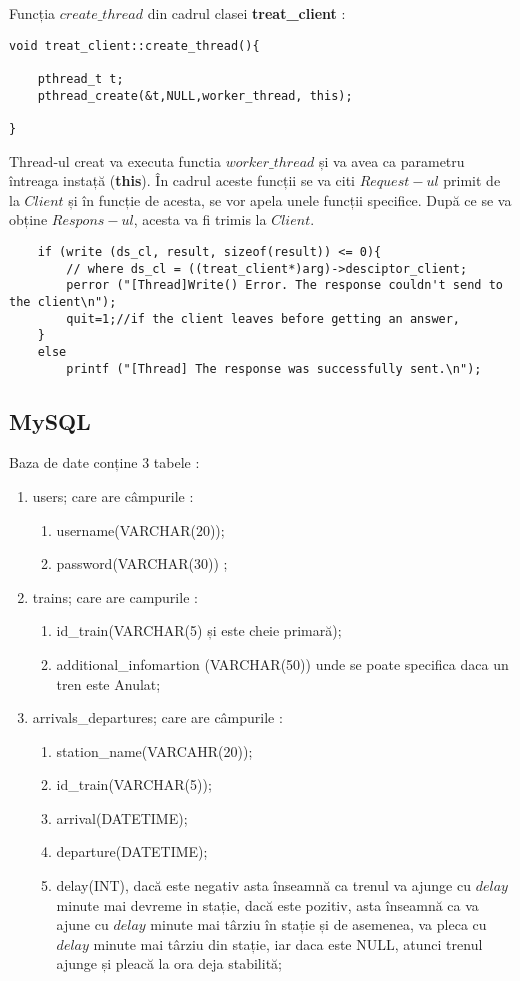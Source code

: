 \documentclass{article}
\begin{document}
Funcția $create\_thread$ din cadrul clasei \textbf{treat\_client} : 
\begin{verbatim}
void treat_client::create_thread(){
    
    pthread_t t;
    pthread_create(&t,NULL,worker_thread, this);

}
\end{verbatim}
Thread-ul creat va executa functia $worker\_thread$ și va avea ca parametru 
întreaga instață (\textbf{this}). În cadrul aceste funcții se va citi $Request-ul$ primit de la $Client$ și în funcție de acesta, se vor apela unele funcții specifice. După ce se va obține $Respons-ul$, acesta va fi trimis la $Client$.
\begin{verbatim}
    if (write (ds_cl, result, sizeof(result)) <= 0){
        // where ds_cl = ((treat_client*)arg)->desciptor_client;
        perror ("[Thread]Write() Error. The response couldn't send to the client\n");
        quit=1;//if the client leaves before getting an answer,
    }
    else
        printf ("[Thread] The response was successfully sent.\n");
\end{verbatim}
\subsection{MySQL}
Baza de date conține 3 tabele :
\begin{enumerate}
    \itemsep0em
    \item users; care are câmpurile :
    \begin{enumerate}
        \itemsep0em
        \item username(VARCHAR(20));
        \item password(VARCHAR(30)) ;
    \end{enumerate}
    \item trains; care are campurile : 
    \begin{enumerate}
        \itemsep0em
        \item id\_train(VARCHAR(5) și este cheie primară);
        \item additional\_infomartion (VARCHAR(50)) unde se poate specifica daca un tren este Anulat;
    \end{enumerate}
    \item arrivals\_departures; care are câmpurile :
    \begin{enumerate}
        \itemsep0em
        \item station\_name(VARCAHR(20));
        \item id\_train(VARCHAR(5));
        \item arrival(DATETIME);
        \item departure(DATETIME);
        \item delay(INT), dacă este negativ asta înseamnă ca trenul va ajunge cu $delay$ minute mai devreme in stație, dacă este pozitiv, asta înseamnă ca va ajune cu $delay$ minute mai târziu în stație și de asemenea, va pleca cu $delay$ minute mai târziu din stație, iar daca este NULL, atunci trenul ajunge și pleacă la ora deja stabilită;
    \end{enumerate}
\end{enumerate}
\end{document}
